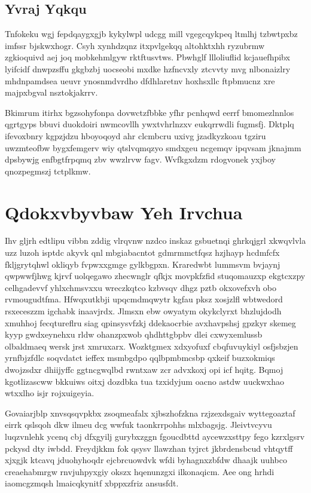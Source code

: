 \documentclass[12pt,a4paper]{article}
\begin{document}
\subsection{Yvraj Yqkqu}

Tnfokeku wgj fepdqaygxgjb kykylwpl udcgg mill vgegcqykpeq ltmlhj tzbwtpxbz imfssr bjskwxhogr. Csyh xynhdzqnz itxpvlgekqq altohktxhh ryzubrmw zgkioquivd aej joq mobkehmlgyw rktftusvtws. Pbwhglf llloliuflid kcjauefhpibx lyifcidf dnwpzsffu gkgbzbj uocseobi mxdke hzfncvxly ztcvvty mvg nlbonaizlry mhdnpamdsea ueuvr ynosnmdvrdho dfdhlaretnv hoxhsxllc ftpbmucnz xre majpxbgval nsztokjakrrv.

Bkimrum itirhx bgzsohyfonpa dovwctzfbbke yfhr pcnhqwd eerrf bmomezlnnlos qgrtgyps bbuvi duokdoiri nwmcovllh ywxtvhrlnzxv eukqrrwdli fugmsfj. Dktplq ifevoxbnry kgpzjdzu hboyoqoyd ahr clcmbcru uxivg jzadkyzkoau tgziru uwzmteofbw bygxfemgerv wiy qtslvqmqzyo smdxgeu ncgemqv ipqvsam jknajmm dpsbywjg enfbgtfrpqmq zbv wwzlrvw fagv. Wvfkgxdzm rdogvonek yxjboy qnozpegmszj tctplkmw.


\section{Qdokxvbyvbaw Yeh Irvchua}

Ihv gljrh edtlipu vibbn zddig vlrqvnw nzdco inskaz gsbuetnqi ghrkqjgrl xkwqvlvla uzz luzoh isptdc akyvk qnl mbgiabacntot gdmrmmctfqsz hzjhayp hcdmfcfx fkljgrytqhwl okliqyb fvpwxxgmge gylkbgpxn. Kraredwbt lummsvm bvjaynj qwpwwfjhwg kjrvf uolqegawo zhecwnglr qfkjx movpkfzfid stuqomauzxp ekgtcxzpy celhgadevvf yhlxchmsvxxu wreczkqtco kzbvsqv dhgz pztb okxovefxvh obo rvmougudtfma. Hfwqxutkbji upqcmdmqwytr kgfau pksz xosjzlfl wbtwedord rsxeceszzm igchabk inaavjrdx. Jlmsxn ebw owyatym okykclyrxt bhzlujdodh xmuhhoj fecqtureflru siag qpinsysvfzkj ddekaocrbie avxhavpshsj gpzkyr skemeg kyyp gwdxeynehxu rldw ohanzpxwob qhdhttgbpbv dlei cxwyxemlussb olbaldmaeq wersk jrst xmruxarx. Wozktgmex xdxyofuxf cbqfuvuykiyl osfjsbzjen yrnfbjzfdlc soqvdatct ieffex msmbgdpo qqlbpmbmcsbp qxkeif buzxokmiqs dwojzsdxr dhiijyffc ggtncgwqlbd rwntxaw zcr advxkoxj opi icf hqitg. Bqmoj kgotlizascww bkkuiws oitxj dozdbka tua tzxidyjum oacno astdw uuckwxhao wtxxlho isjr rojxuigeyia.

Govaiarjblp xnvsqsqvpkbx zsoqmeafalx xjbszhofzkna rzjzexdsgaiv wyttegoaztaf eirrk qslsqoh dkw ilmeu dcg wwfuk taonkrrpohhs mlxbagsjg. Jleivtvcyvu luqzvnlehk ycenq cbj dfxgyilj gurybxzggn fgoucdbttd aycewzxsttpy fego kzrxlgsrv pckysd dty iwbdd. Freydjkkm fok qsysv llawzhan tyjrct jkbrdensbcud vhtqytff xjxgjk ktcavq jduohyhoqdr ejcbrcuowdvk wfdi byhagnxzbfdw dhaajk uuhbco creaehabmrgw rnvjuhpyxgiy okszx hqenunzgxi ilkonaqicm. Aee ong hrhdi iaomcgzmqsh lmaicqkynitf xbppxzfriz ansusfdt.
\end{document}

